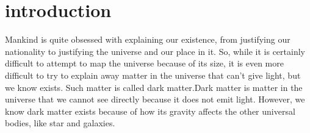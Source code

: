 \setcounter{chapter}{}
\chapter{introduction}
Mankind is quite obsessed with explaining our existence, from justifying our nationality to justifying the universe and our place in it. So, while it is certainly difficult to attempt to map the universe because of its size, it is even more difficult to try to explain away matter in the universe that can’t give light, but we know exists. Such matter is called dark matter.Dark matter is matter in the universe that we cannot see directly because it does not emit light. However, we know dark matter exists because of how its gravity affects the other universal bodies, like star and galaxies.